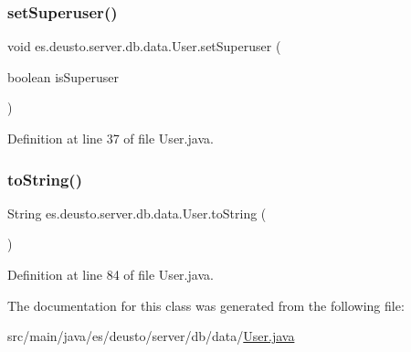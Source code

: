 \subsubsection{\texorpdfstring{set\+Superuser()}{setSuperuser()}}
{\footnotesize\ttfamily void es.\+deusto.\+server.\+db.\+data.\+User.\+set\+Superuser (\begin{DoxyParamCaption}\item[{boolean}]{is\+Superuser }\end{DoxyParamCaption})}



Definition at line 37 of file User.\+java.

\mbox{\label{classes_1_1deusto_1_1server_1_1db_1_1data_1_1_user_a494980951c4c71c0a793994b7bcd5101}} 
\subsubsection{\texorpdfstring{to\+String()}{toString()}}
{\footnotesize\ttfamily String es.\+deusto.\+server.\+db.\+data.\+User.\+to\+String (\begin{DoxyParamCaption}{ }\end{DoxyParamCaption})}



Definition at line 84 of file User.\+java.



The documentation for this class was generated from the following file\+:\begin{DoxyCompactItemize}
\item 
src/main/java/es/deusto/server/db/data/\hyperlink{_user_8java}{User.\+java}\end{DoxyCompactItemize}
